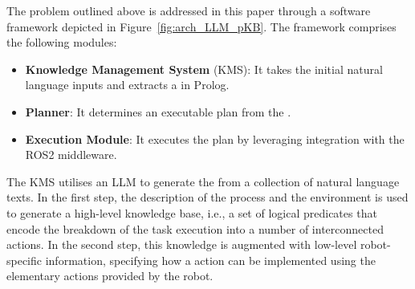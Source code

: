 The problem outlined above is addressed in this paper through a software framework depicted in Figure~\ref{fig:arch_LLM_pKB}. The framework comprises the following modules:
\begin{itemize}
    \item \textbf{Knowledge Management System} (KMS): It takes the initial natural language inputs and extracts a \kb in Prolog.
    \item \textbf{Planner}: It determines an executable plan from the \kb.
    \item \textbf{Execution Module}: It executes the plan by leveraging integration with the ROS2 middleware.
\end{itemize}

The KMS utilises an LLM to generate the \kb from a collection of
natural language texts. In the first step, the description of the
process and the environment is used to generate a high-level knowledge
base, i.e., a set of logical predicates that encode the breakdown of
the task execution into a number of interconnected \HL
actions. In the second step, this knowledge is augmented with
low-level robot-specific information, specifying how a \HL action can be
implemented using the elementary actions provided by the robot.

